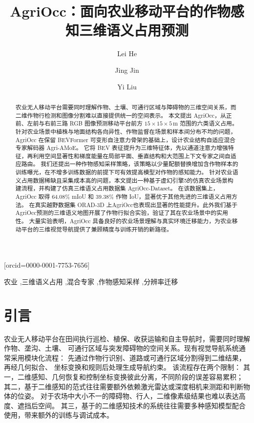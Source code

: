 \documentclass[a4paper,fleqn]{cas-sc}
\begin{document}
\let\WriteBookmarks\relax
\def\floatpagepagefraction{1}
\def\textpagefraction{.001}
\title[mode=title]{AgriOcc：面向农业移动平台的作物感知三维语义占用预测}
\author[1]{Lei He}
\author[1]{Jing Jin}[orcid=0000-0001-7753-7656]
\cormark[1]
\author[2]{Yi Liu}


\begin{abstract}
农业无人移动平台需要同时理解作物、土壤、可通行区域与障碍物的三维空间关系，而二维作物行检测和图像分割难以直接提供统一的空间表示。
本文提出 AgriOcc，从正前、左前与右前三路 RGB 图像预测移动平台前方 $15\times15\times5\,\mathrm{m}$ 范围的六类语义占用。
针对农业场景中植株与地面结构各向异性、作物监督在场景和样本间分布不均的问题，
AgriOcc 在保留 BEVFormer 可变形自注意力骨架的基础上，设计农业结构自适应混合专家解码器 Agri-AMoE。
它将 BEV 表征提升为三维特征体，先以通道注意力增强特征，再利用空间显著性和梯度能量在局部平面、垂直结构和大范围上下文专家之间自适应路由。
我们还提出一种作物感知采样策略，该策略以少量配额替换增加含作物样本的训练曝光，在不增多训练数据的前提下可有效提高模型对作物的感知能力。
针对农业语义占用数据稀缺且采集成本高的问题，本文提出一种基于虚幻引擎5的仿真农业场景构建流程，并构建了仿真三维语义占用数据集 AgriOcc-Dataset。
在该数据集上，AgriOcc 取得 64.08\% mIoU 和 39.38\% 作物 IoU，显著优于其他先进的三维语义占用方法。
在真实越野数据集 ORAD-3D 上AgriOcc也表现出显著的性能提升。此外我们基于AgriOcc预测的三维语义地图开展了作物行拟合实验，验证了其在农业场景中的实用性。
大量实验表明，AgriOcc 具备良好的农业场景理解与真实环境迁移能力，为农业移动平台的三维视觉导航提供了兼顾精度与训练开销的新路径。
\end{abstract}
\begin{keywords}
农业 \sep 三维语义占用 \sep 混合专家 \sep 作物感知采样 \sep 分辨率迁移
\end{keywords}
\maketitle
\section{引言}\label{sec:intro}
农业无人移动平台在田间执行巡检、植保、收获运输和自主导航时，需要同时理解作物、垄沟、土壤、
可通行区域与突发障碍物的空间关系。现有视觉导航系统通常采用模块化流程：
先通过作物行识别、道路或可通行区域分割得到二维结果，再经几何拟合、
坐标变换和规则后处理生成导航约束\citep{nkwochaComprehensiveReviewSensing2025,baiVisionbasedNavigationGuidance2023}。
该流程存在两个限制：
其一，二维感知、几何恢复和控制坐标变换彼此分离，不同阶段的误差容易累积；
其二，基于二维感知的范式往往需要额外依赖激光雷达或深度相机来测距和判断物体的位姿。
对于农场中大小不一的障碍物、行人，二维像素级结果也难以表达高度、遮挡后空间。
其三，基于的二维感知技术的系统往往需要多种感知模型配合使用，带来额外的训练与调试成本。
\end{document}
